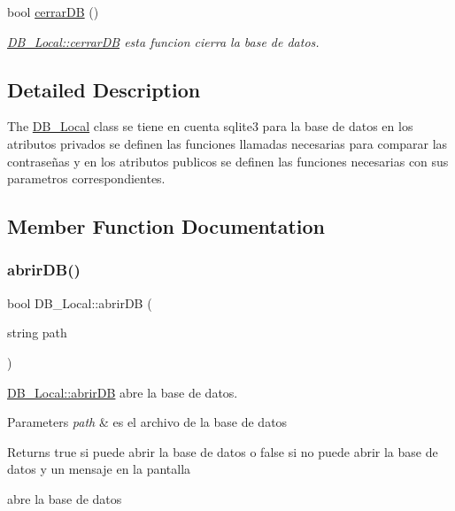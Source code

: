 \begin{DoxyCompactItemize}
bool \hyperlink{class_d_b___local_aa5f3f6315c55e86a030da1c4c9b3a4cb}{cerrar\+DB} ()
\begin{DoxyCompactList}\small\item\em \hyperlink{class_d_b___local_aa5f3f6315c55e86a030da1c4c9b3a4cb}{D\+B\+\_\+\+Local\+::cerrar\+DB} esta funcion cierra la base de datos. \end{DoxyCompactList}\end{DoxyCompactItemize}


\subsection{Detailed Description}
The \hyperlink{class_d_b___local}{D\+B\+\_\+\+Local} class se tiene en cuenta sqlite3 para la base de datos en los atributos privados se definen las funciones llamadas necesarias para comparar las contraseñas y en los atributos publicos se definen las funciones necesarias con sus parametros correspondientes. 

\subsection{Member Function Documentation}
\mbox{\label{class_d_b___local_ad8637aa272a8a361ae2a6e1e7f8cd71c}} 
\subsubsection{\texorpdfstring{abrir\+D\+B()}{abrirDB()}}
{\footnotesize\ttfamily bool D\+B\+\_\+\+Local\+::abrir\+DB (\begin{DoxyParamCaption}\item[{string}]{path }\end{DoxyParamCaption})}



\hyperlink{class_d_b___local_ad8637aa272a8a361ae2a6e1e7f8cd71c}{D\+B\+\_\+\+Local\+::abrir\+DB} abre la base de datos. 


\begin{DoxyParams}{Parameters}
{\em path} & es el archivo de la base de datos \\
\hline
\end{DoxyParams}
\begin{DoxyReturn}{Returns}
true si puede abrir la base de datos o false si no puede abrir la base de datos y un mensaje en la pantalla 
\end{DoxyReturn}
abre la base de datos\mbox{\label{class_d_b___local_af177cdf53157cb7da307a50b95b19001}} 
